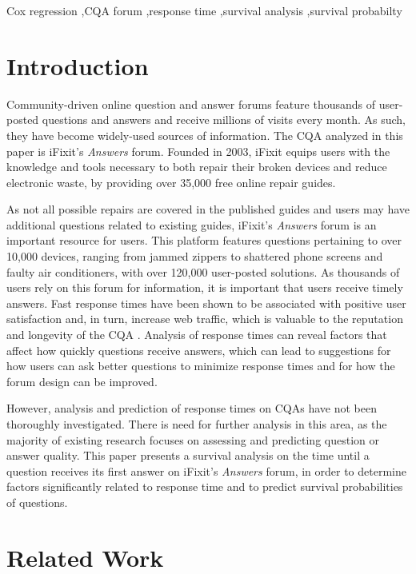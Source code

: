 \documentclass[]{interact}\usepackage[]{graphicx}\usepackage[]{color}
\begin{document}
{\begin{keywords}
Cox regression \sep CQA forum \sep response time \sep survival analysis \sep survival probabilty 
\end{keywords}




\section{Introduction}

Community-driven online question and answer forums feature thousands of user-posted questions and answers and receive millions of visits every month. As such, they have become widely-used sources of information. The CQA analyzed in this paper is iFixit's \textit{Answers} forum. Founded in 2003, iFixit equips users with the knowledge and tools necessary to both repair their broken devices and reduce electronic waste, by providing over 35,000 free online repair guides. 

As not all possible repairs are covered in the published guides and users may have additional questions related to existing guides, iFixit's \textit{Answers} forum is an important resource for users. This platform features questions pertaining to over 10,000 devices, ranging from jammed zippers to shattered phone screens and faulty air conditioners, with over 120,000 user-posted solutions. As thousands of users rely on this forum for information, it is important that users receive timely answers. Fast response times have been shown to be associated with positive user satisfaction and, in turn, increase web traffic, which is valuable to the reputation and longevity of the CQA \citep{Rechavi2011}. Analysis of response times can reveal factors that affect how quickly questions receive answers, which can lead to suggestions for how users can ask better questions to minimize response times and for how the forum design can be improved.

However, analysis and prediction of response times on CQAs have not been thoroughly investigated. There is need for further analysis in this area, as the majority of existing research focuses on assessing and predicting question or answer quality. This paper presents a survival analysis on the time until a question receives its first answer on iFixit's \textit{Answers} forum, in order to determine factors significantly related to response time and to predict survival probabilities of questions.


\section{Related Work}

}
\end{document}
